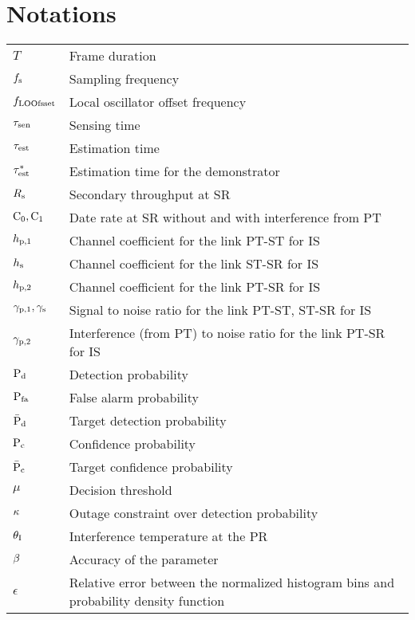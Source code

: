 
\chapter{Notations}
\renewcommand{\arraystretch}{1.4}
\begin{longtable}{p{}p{}}

       $T$                     &       Frame duration \\
       $f_{\text{s}}$                 &       Sampling frequency \\
       $f_{\text{LOOfsset}}$                  &       Local oscillator offset frequency \\
       $\tau_{\text{sen}}$                 &       Sensing time \\
       $\tau_{\text{est}}$                 &       Estimation time \\      
       ${\tau}^*_{\text{est}}$               &       Estimation time for the demonstrator \\      
       $R_{\text{s}}$                   &       Secondary throughput at SR \\
       $\text{C}_{\text{0}},\text{C}_{\text{1}}$               &       Date rate at SR without and with interference from PT  \\
      
       $h_{\text{p,1}}$                  &       Channel coefficient for the link PT-ST for IS \\
       $h_{\text{s}}$                   &       Channel coefficient for the link ST-SR for IS \\
       $h_{\text{p,2}}$                  &       Channel coefficient for the link PT-SR for IS \\
       ${\gamma}_{\text{p,1}}, {\gamma}_{\text{s}}$      &       Signal to noise ratio for the link PT-ST, ST-SR for IS \\
       ${\gamma}_{\text{p,2}}$                &       Interference (from PT) to noise ratio for the link PT-SR for IS \\

       $\text{P}_{\text{d}}$                   &       Detection probability \\ 
       $\text{P}_{\text{fa}}$                  &       False alarm probability \\ 
       $\bar{\text{P}}_{\text{d}}$                  &       Target detection probability \\ 
       $\text{P}_{\text{c}}$                  &       Confidence probability \\ 
       $\bar{\text{P}}_{\text{c}}$                 &       Target confidence probability \\ 
       $\mu$                   &       Decision threshold \\ 
       $\kappa$                  &       Outage constraint over detection probability \\ 
       $\theta_{\text{I}}$                  &       Interference temperature at the PR \\ 
       $\beta$	               &       Accuracy of the parameter \\	
       $\epsilon$	       &       Relative error between the normalized histogram bins and probability density function  \\	


\end{longtable}
